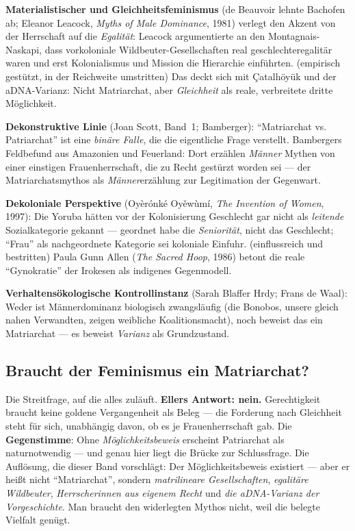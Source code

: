 \documentclass[11pt,a4paper,ngerman]{scrartcl}
\newcommand{\chipbase}[2]{\hspace{0pt}{\footnotesize\textcolor{#1}{[\textsc{#2}]}}}
\newcommand{\chipbelegt}[1]{\chipbase{chipgreen}{#1}}
\newcommand{\chipplausibel}[1]{\chipbase{chipamber}{#1}}
\newcommand{\chipumstritten}[1]{\chipbase{chipred}{#1}}
\begin{document}
\textbf{Materialistischer und Gleichheitsfeminismus} (de Beauvoir lehnte Bachofen ab; Eleanor Leacock, \emph{Myths of Male Dominance}, 1981) verlegt den Akzent von der Herrschaft auf die \emph{Egalität}: Leacock argumentierte an den Montagnais-Naskapi, dass vorkoloniale Wildbeuter-Gesellschaften real geschlechteregalitär waren und erst Kolonialismus und Mission die Hierarchie einführten. \chipplausibel{plausibel} (empirisch gestützt, in der Reichweite umstritten) Das deckt sich mit Çatalhöyük und der aDNA-Varianz: Nicht Matriarchat, aber \emph{Gleichheit} als reale, verbreitete dritte Möglichkeit.

\textbf{Dekonstruktive Linie} (Joan Scott, Band~1; Bamberger): \enquote{Matriarchat vs. Patriarchat} ist eine \emph{binäre Falle}, die die eigentliche Frage verstellt. Bambergers Feldbefund aus Amazonien und Feuerland: Dort erzählen \emph{Männer} Mythen von einer einstigen Frauenherrschaft, die zu Recht gestürzt worden sei --- der Matriarchatsmythos als \emph{Männer}erzählung zur Legitimation der Gegenwart. \chipbelegt{belegt}

\textbf{Dekoloniale Perspektive} (Oyèrónké Oyěwùmí, \emph{The Invention of Women}, 1997): Die Yoruba hätten vor der Kolonisierung Geschlecht gar nicht als \emph{leitende} Sozialkategorie gekannt --- geordnet habe die \emph{Seniorität}, nicht das Geschlecht; \enquote{Frau} als nachgeordnete Kategorie sei koloniale Einfuhr. \chipumstritten{umstritten} (einflussreich und bestritten) Paula Gunn Allen (\emph{The Sacred Hoop}, 1986) betont die reale \enquote{Gynokratie} der Irokesen als indigenes Gegenmodell.

\textbf{Verhaltensökologische Kontrollinstanz} (Sarah Blaffer Hrdy; Frans de Waal): Weder ist Männerdominanz biologisch zwangsläufig (die Bonobos, unsere gleich nahen Verwandten, zeigen weibliche Koalitionsmacht), noch beweist das ein Matriarchat --- es beweist \emph{Varianz} als Grundzustand. \chipplausibel{plausibel}

\subsection*{Braucht der Feminismus ein Matriarchat?}
Die Streitfrage, auf die alles zuläuft. \textbf{Ellers Antwort: nein.} Gerechtigkeit braucht keine goldene Vergangenheit als Beleg --- die Forderung nach Gleichheit steht für sich, unabhängig davon, ob es je Frauenherrschaft gab. Die \textbf{Gegenstimme}: Ohne \emph{Möglichkeitsbeweis} erscheint Patriarchat als naturnotwendig --- und genau hier liegt die Brücke zur Schlussfrage. Die Auflösung, die dieser Band vorschlägt: Der Möglichkeitsbeweis existiert --- aber er heißt nicht \enquote{Matriarchat}, sondern \emph{matrilineare Gesellschaften}, \emph{egalitäre Wildbeuter}, \emph{Herrscherinnen aus eigenem Recht} und \emph{die aDNA-Varianz der Vorgeschichte}. Man braucht den widerlegten Mythos nicht, weil die belegte Vielfalt genügt. \chipplausibel{plausibel}
\end{document}
